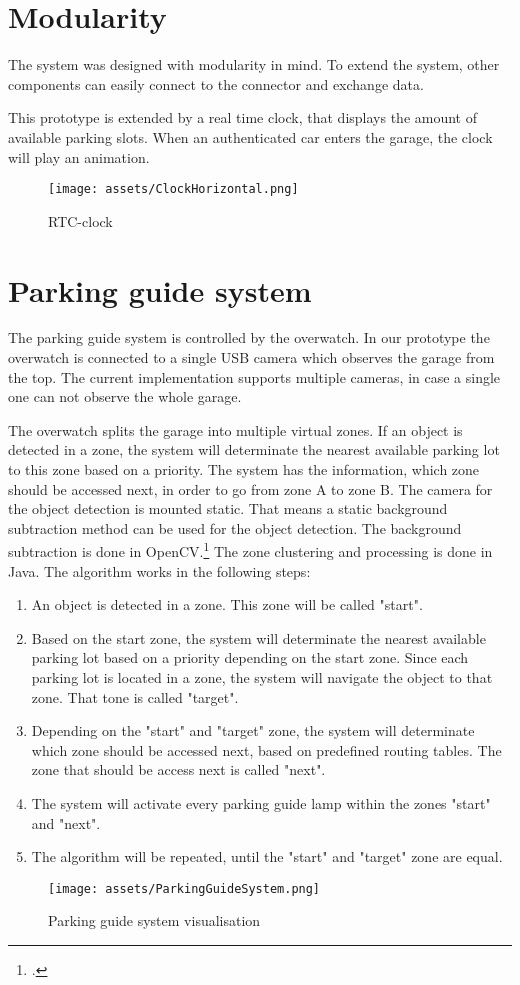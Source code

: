 \section{Modularity}
The system was designed with modularity in mind. To extend the system, other components can easily connect to the connector and exchange data.

\par
This prototype is extended by a real time clock, that displays the amount of available parking slots. When an authenticated car enters the garage, the clock will play an animation.

\begin{figure}[H]
    \centering
    \texttt{[image: assets/ClockHorizontal.png]}
    \caption{RTC-clock}
    \label{fig:Real time clock}
\end{figure}

\section{Parking guide system}
The parking guide system is controlled by the overwatch. In our prototype the overwatch is connected to a single USB camera which observes the garage from the top. The current implementation supports multiple cameras, in case a single one can not observe the whole garage.
\par
The overwatch splits the garage into multiple virtual zones. If an object is detected in a zone, the system will determinate the nearest available parking lot to this zone based on a priority. 
The system has the information, which zone should be accessed next, in order to go from zone A to zone B. 
The camera for the object detection is mounted static. That means a static background subtraction method can be used for the object detection. The background subtraction is done in OpenCV.\footcite[][]{backgroundSubtraction} The zone clustering and processing is done in Java.
The algorithm works in the following steps:
\begin{enumerate}
    \item An object is detected in a zone. This zone will be called "start".
    \item Based on the start zone, the system will determinate the nearest available parking lot based on a priority depending on the start zone. Since each parking lot is located in a zone, the system will navigate the object to that zone. That tone is called "target".
    \item Depending on the "start" and "target" zone, the system will determinate which zone should be accessed next, based on predefined routing tables. The zone that should be access next is called "next".
    \item The system will activate every parking guide lamp within the zones "start" and "next".
    \item The algorithm will be repeated, until the "start" and "target" zone are equal.
\end{enumerate}
\begin{figure}
    \centering
    \texttt{[image: assets/ParkingGuideSystem.png]}
    \caption{Parking guide system visualisation}
    \label{fig:Parking guide system visualisation}
\end{figure}
